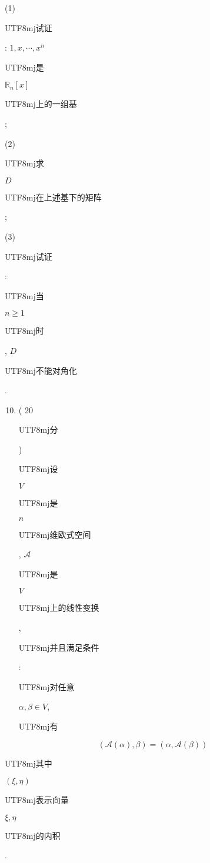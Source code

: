 \documentclass[10pt]{article}
\begin{document}
(1) \begin{CJK}{UTF8}{mj}试证\end{CJK}: $1, x, \cdots, x^{n}$ \begin{CJK}{UTF8}{mj}是\end{CJK} $\mathbb{R}_{n}[x]$ \begin{CJK}{UTF8}{mj}上的一组基\end{CJK};

(2) \begin{CJK}{UTF8}{mj}求\end{CJK} $D$ \begin{CJK}{UTF8}{mj}在上述基下的矩阵\end{CJK};

(3) \begin{CJK}{UTF8}{mj}试证\end{CJK}: \begin{CJK}{UTF8}{mj}当\end{CJK} $n \geq 1$ \begin{CJK}{UTF8}{mj}时\end{CJK}, $D$ \begin{CJK}{UTF8}{mj}不能对角化\end{CJK}.

\begin{enumerate}
  \setcounter{enumi}{9}
  \item ( 20 \begin{CJK}{UTF8}{mj}分\end{CJK}) \begin{CJK}{UTF8}{mj}设\end{CJK} $V$ \begin{CJK}{UTF8}{mj}是\end{CJK} $n$ \begin{CJK}{UTF8}{mj}维欧式空间\end{CJK}, $\mathscr{A}$ \begin{CJK}{UTF8}{mj}是\end{CJK} $V$ \begin{CJK}{UTF8}{mj}上的线性变换\end{CJK}, \begin{CJK}{UTF8}{mj}并且满足条件\end{CJK}: \begin{CJK}{UTF8}{mj}对任意\end{CJK} $\alpha, \beta \in V$, \begin{CJK}{UTF8}{mj}有\end{CJK}
\end{enumerate}
$$
(\mathscr{A}(\alpha), \beta)=(\alpha, \mathscr{A}(\beta))
$$
\begin{CJK}{UTF8}{mj}其中\end{CJK} $(\xi, \eta)$ \begin{CJK}{UTF8}{mj}表示向量\end{CJK} $\xi, \eta$ \begin{CJK}{UTF8}{mj}的内积\end{CJK}.
\end{document}
